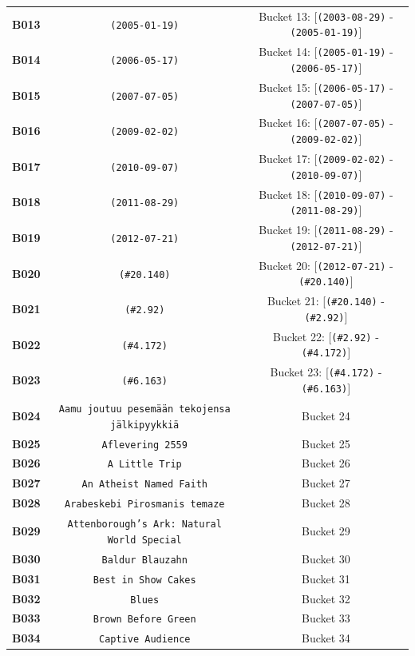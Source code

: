 \documentclass[11pt,a4paper]{article}
\begin{document}
{{\begin{xltabular}{\textwidth}{l | C | C}
\textbf{B013} & \texttt{(2005-01-19)} & Bucket 13: [\texttt{(2003-08-29)} - \texttt{(2005-01-19)}] \\
\textbf{B014} & \texttt{(2006-05-17)} & Bucket 14: [\texttt{(2005-01-19)} - \texttt{(2006-05-17)}] \\
\textbf{B015} & \texttt{(2007-07-05)} & Bucket 15: [\texttt{(2006-05-17)} - \texttt{(2007-07-05)}] \\
\textbf{B016} & \texttt{(2009-02-02)} & Bucket 16: [\texttt{(2007-07-05)} - \texttt{(2009-02-02)}] \\
\textbf{B017} & \texttt{(2010-09-07)} & Bucket 17: [\texttt{(2009-02-02)} - \texttt{(2010-09-07)}] \\
\textbf{B018} & \texttt{(2011-08-29)} & Bucket 18: [\texttt{(2010-09-07)} - \texttt{(2011-08-29)}] \\
\textbf{B019} & \texttt{(2012-07-21)} & Bucket 19: [\texttt{(2011-08-29)} - \texttt{(2012-07-21)}] \\
\textbf{B020} & \texttt{(\#20.140)} & Bucket 20: [\texttt{(2012-07-21)} - \texttt{(\#20.140)}] \\
\textbf{B021} & \texttt{(\#2.92)} & Bucket 21: [\texttt{(\#20.140)} - \texttt{(\#2.92)}] \\
\textbf{B022} & \texttt{(\#4.172)} & Bucket 22: [\texttt{(\#2.92)} - \texttt{(\#4.172)}] \\
\textbf{B023} & \texttt{(\#6.163)} & Bucket 23: [\texttt{(\#4.172)} - \texttt{(\#6.163)}] \\
\textbf{B024} & \texttt{Aamu joutuu pesemään tekojensa jälkipyykkiä} & Bucket 24 \\
\textbf{B025} & \texttt{Aflevering 2559} & Bucket 25 \\
\textbf{B026} & \texttt{A Little Trip} & Bucket 26 \\
\textbf{B027} & \texttt{An Atheist Named Faith} & Bucket 27 \\
\textbf{B028} & \texttt{Arabeskebi Pirosmanis temaze} & Bucket 28 \\
\textbf{B029} & \texttt{Attenborough's Ark: Natural World Special} & Bucket 29 \\
\textbf{B030} & \texttt{Baldur Blauzahn} & Bucket 30 \\
\textbf{B031} & \texttt{Best in Show Cakes} & Bucket 31 \\
\textbf{B032} & \texttt{Blues} & Bucket 32 \\
\textbf{B033} & \texttt{Brown Before Green} & Bucket 33 \\
\textbf{B034} & \texttt{Captive Audience} & Bucket 34 \\

\end{xltabular}}}
\end{document}
